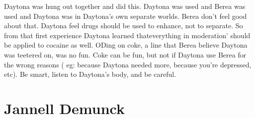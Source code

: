 \documentclass[12pt]{book}
\begin{document}
Daytona was hung out together and did this. Daytona was used and Berea was used and Daytona was in Daytona's own separate worlds. Berea don't feel good about that. Daytona feel drugs should be used to enhance, not to separate. So from that first experience Daytona learned thateverything in moderation' should be applied to cocaine as well. ODing on coke, a line that Berea believe Daytona was teetered on, was no fun. Coke can be fun, but not if Daytona use Berea for the wrong reasons ( eg: because Daytona needed more, because you're depressed, etc). Be smart, listen to Daytona's body, and be careful.



\chapter{Jannell Demunck}
\end{document}
